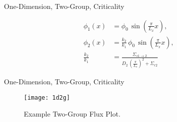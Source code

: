\begin{frame}{One-Dimension, Two-Group, Criticality}
  \begin{table}
    \label{tab:1d2g}
    \begin{center}
    \end{center}
  \end{table}
  \begin{align}
    \phi_1(x) &= \phi_0 \, \sin\left(\frac{\pi}{L_x} x \right), \\
    \phi_2(x) &= \frac{k_2}{k_1} \, \phi_0 \, \sin\left(\frac{\pi}{L_x} x
      \right), \\
    \frac{k_2}{k_1} &= \frac{\Sigma_{s 1\rightarrow 2}}{D_2 \,
      \left(\frac{\pi}{L_x}\right)^2 + \Sigma_{r2}}
  \end{align}
\end{frame}

\begin{frame}{One-Dimension, Two-Group, Criticality}
  \begin{figure}
    \centering
    \texttt{[image: 1d2g]}
    \caption{Example Two-Group Flux Plot.}
    \label{fig:1d2g}
  \end{figure}
\end{frame}


